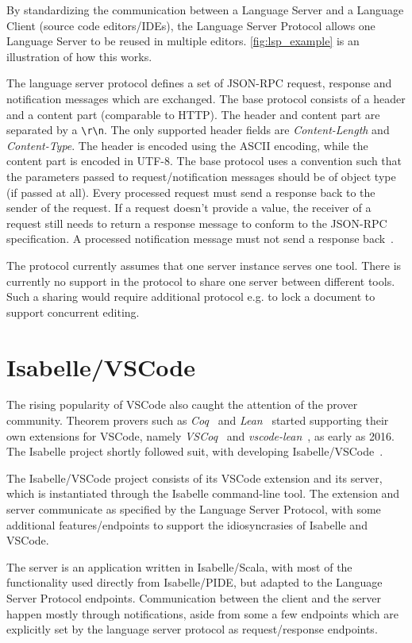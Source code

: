 By standardizing the communication between a Language Server and a Language Client (source code editors/IDEs), the Language Server Protocol allows one Language Server to be reused in multiple editors. \autoref{fig:lsp_example} is an illustration of how this works.

The language server protocol defines a set of JSON-RPC request, response and notification messages which are exchanged. The base protocol consists of a header and a content part (comparable to HTTP). The header and content part are separated by a \texttt{\textbackslash r\textbackslash n}. The only supported header fields are \emph{Content-Length} and \emph{Content-Type}. The header is encoded using the ASCII encoding, while the content part is encoded in UTF-8. The base protocol uses a convention such that the parameters passed to request/notification messages should be of object type (if passed at all). Every processed request must send a response back to the sender of the request. If a request doesn’t provide a value, the receiver of a request still needs to return a response message to conform to the JSON-RPC specification. A processed notification message must not send a response back~\parencite{lsp_spec}.

The protocol currently assumes that one server instance serves one tool. There is currently no support in the protocol to share one server between different tools. Such a sharing would require additional protocol e.g. to lock a document to support concurrent editing.


\section{Isabelle/VSCode}
The rising popularity of VSCode also caught the attention of the prover community. Theorem provers such as \emph{Coq}~\parencite{coq} and \emph{Lean}~\parencite{lean} started supporting their own extensions for VSCode, namely \emph{VSCoq}~\parencite{vscoq} and \emph{vscode-lean}~\parencite{vscode-lean}, as early as 2016. The Isabelle project shortly followed suit, with \citeauthor{ivsc_report} developing Isabelle/VSCode~\parencite{ivsc_report}.

The Isabelle/VSCode project consists of its VSCode extension and its server, which is instantiated through the Isabelle command-line tool. The extension and server communicate as specified by the Language Server Protocol, with some additional features/endpoints to support the idiosyncrasies of Isabelle and VSCode.

The server is an application written in Isabelle/Scala, with most of the functionality used directly from Isabelle/PIDE, but adapted to the Language Server Protocol endpoints. Communication between the client and the server happen mostly through notifications, aside from some a few endpoints which are explicitly set by the language server protocol as request/response endpoints.

